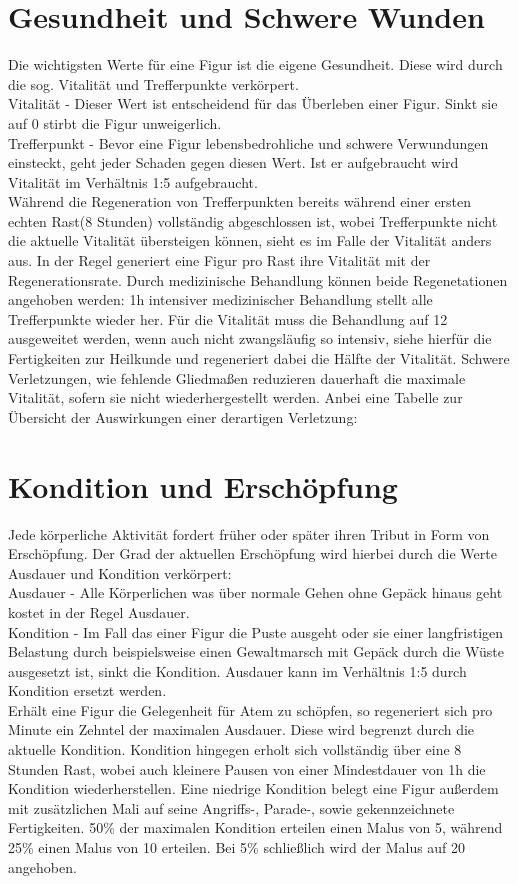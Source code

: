 \documentclass[a4paper,12pt,oneside]{book}
\begin{document}
\chapter{Gesundheit und Schwere Wunden}
Die wichtigsten Werte für eine Figur ist die eigene Gesundheit. Diese wird durch die sog. Vitalität und Trefferpunkte verkörpert.
\\Vitalität - Dieser Wert ist entscheidend für das Überleben einer Figur. Sinkt sie auf 0 stirbt die Figur unweigerlich.
\\Trefferpunkt - Bevor eine Figur lebensbedrohliche und schwere Verwundungen einsteckt, geht jeder Schaden gegen diesen Wert. Ist er aufgebraucht wird Vitalität im Verhältnis 1:5 aufgebraucht.
\\Während die Regeneration von Trefferpunkten bereits während einer ersten echten Rast(8 Stunden) vollständig abgeschlossen ist, wobei Trefferpunkte nicht die aktuelle Vitalität übersteigen können, sieht es im Falle der Vitalität anders aus. In der Regel generiert eine Figur pro Rast ihre Vitalität mit der Regenerationsrate. Durch medizinische Behandlung können beide Regenetationen angehoben werden: 1h intensiver medizinischer Behandlung stellt alle Trefferpunkte wieder her. Für die Vitalität muss die Behandlung auf 12 ausgeweitet werden, wenn auch nicht zwangsläufig so intensiv, siehe hierfür die Fertigkeiten zur Heilkunde und regeneriert dabei die Hälfte der Vitalität.
Schwere Verletzungen, wie fehlende Gliedmaßen reduzieren dauerhaft die maximale Vitalität, sofern sie nicht wiederhergestellt werden. Anbei eine Tabelle zur Übersicht der Auswirkungen einer derartigen Verletzung:

\chapter{Kondition und Erschöpfung}
Jede körperliche Aktivität fordert früher oder später ihren Tribut in Form von Erschöpfung. Der Grad der aktuellen Erschöpfung wird hierbei durch die Werte Ausdauer und Kondition verkörpert:
\\Ausdauer - Alle Körperlichen was über normale Gehen ohne Gepäck hinaus geht kostet in der Regel Ausdauer.
\\Kondition - Im Fall das einer Figur die Puste ausgeht oder sie einer langfristigen Belastung durch beispielsweise einen Gewaltmarsch mit Gepäck durch die Wüste ausgesetzt ist, sinkt die Kondition. Ausdauer kann im Verhältnis 1:5 durch Kondition ersetzt werden.
\\Erhält eine Figur die Gelegenheit für Atem zu schöpfen, so regeneriert sich pro Minute ein Zehntel der maximalen Ausdauer. Diese wird begrenzt durch die aktuelle Kondition. Kondition hingegen erholt sich vollständig über eine 8 Stunden Rast, wobei auch kleinere Pausen von einer Mindestdauer von 1h die Kondition wiederherstellen.
Eine niedrige Kondition belegt eine Figur außerdem mit zusätzlichen Mali auf seine Angriffs-, Parade-, sowie gekennzeichnete Fertigkeiten.
50\% der maximalen Kondition erteilen einen Malus von 5, während 25\% einen Malus von 10 erteilen. Bei 5\% schließlich wird der Malus auf 20 angehoben.
\end{document}

